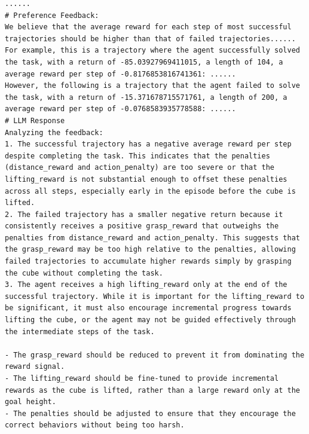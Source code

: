 \documentclass{article}
\theoremstyle{plain}
\theoremstyle{definition}
\theoremstyle{remark}
\begin{document}
\begin{table}[!ht]
\centering
\caption{The code generated after $3$ introspection iteration on \textit{Lift Cube}.}
\begin{tcolorbox}
\begin{lstlisting}[breaklines]
......
# Preference Feedback:
We believe that the average reward for each step of most successful trajectories should be higher than that of failed trajectories......
For example, this is a trajectory where the agent successfully solved the task, with a return of -85.03927969411015, a length of 104, a average reward per step of -0.8176853816741361: ......
However, the following is a trajectory that the agent failed to solve the task, with a return of -15.371678715571761, a length of 200, a average reward per step of -0.0768583935778588: ......
# LLM Response
Analyzing the feedback:
1. The successful trajectory has a negative average reward per step despite completing the task. This indicates that the penalties (distance_reward and action_penalty) are too severe or that the lifting_reward is not substantial enough to offset these penalties across all steps, especially early in the episode before the cube is lifted.
2. The failed trajectory has a smaller negative return because it consistently receives a positive grasp_reward that outweighs the penalties from distance_reward and action_penalty. This suggests that the grasp_reward may be too high relative to the penalties, allowing failed trajectories to accumulate higher rewards simply by grasping the cube without completing the task.
3. The agent receives a high lifting_reward only at the end of the successful trajectory. While it is important for the lifting_reward to be significant, it must also encourage incremental progress towards lifting the cube, or the agent may not be guided effectively through the intermediate steps of the task.

- The grasp_reward should be reduced to prevent it from dominating the reward signal.
- The lifting_reward should be fine-tuned to provide incremental rewards as the cube is lifted, rather than a large reward only at the goal height.
- The penalties should be adjusted to ensure that they encourage the correct behaviors without being too harsh.


\end{lstlisting}
\end{tcolorbox}
\end{table}
\end{document}
